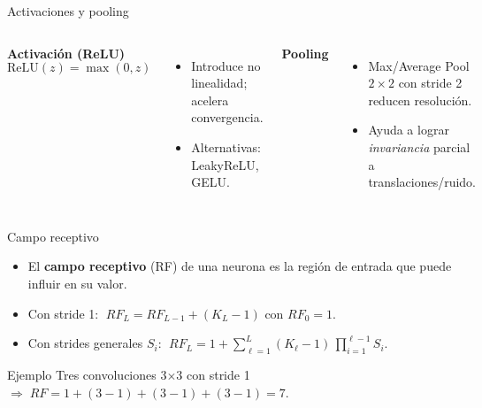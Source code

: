 \documentclass[10pt]{beamer}
\begin{document}
\begin{frame}{Activaciones y pooling}
\begin{columns}
\textbf{Activaci\'on (ReLU)}
\[
\mathrm{ReLU}(z) = \max(0,z)
\]
\begin{itemize}
  \item Introduce no linealidad; acelera convergencia.
  \item Alternativas: LeakyReLU, GELU.
\end{itemize}
\textbf{Pooling}
\begin{itemize}
  \item Max/Average Pool $2\times2$ con stride 2 reducen resoluci\'on.
  \item Ayuda a lograr \emph{invariancia} parcial a translaciones/ruido.
\end{itemize}
\end{columns}
\vspace{2mm}
\centering
{}
\end{frame}

\begin{frame}{Campo receptivo}
\begin{itemize}
  \item El \textbf{campo receptivo} (RF) de una neurona es la regi\'on de entrada que puede influir en su valor.
  \item Con stride 1: $\;RF_L = RF_{L-1} + (K_L - 1)$ con $RF_0=1$.
  \item Con strides generales $S_i$: $\;RF_L = 1 + \sum_{\ell=1}^{L} (K_\ell - 1)\,\prod_{i=1}^{\ell-1} S_i$.
\end{itemize}
\vspace{2mm}
\begin{block}{Ejemplo}
Tres convoluciones 3$\times$3 con stride 1 $\Rightarrow\;RF=1+(3{-}1)+(3{-}1)+(3{-}1)=7$.
\end{block}
\end{frame}
\end{document}
